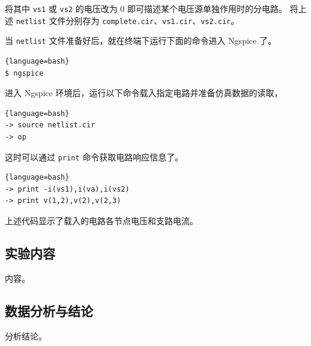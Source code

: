 \documentclass[UTF8,linespread=1.236]{ctexart}
\begin{document}
将其中 \verb|vs1| 或 \verb|vs2| 的电压改为 $0$ 即可描述某个电压源单独作用时的分电路。
将上述 \verb|netlist| 文件分别存为 \verb|complete.cir|、\verb|vs1.cir|、\verb|vs2.cir|。

当 \verb|netlist| 文件准备好后，就在终端下运行下面的命令进入 Ngspice 了。
\begin{lstlisting}{language=bash}
$ ngspice
\end{lstlisting}

进入 Ngspice 环境后，运行以下命令载入指定电路并准备仿真数据的读取，
\begin{lstlisting}{language=bash}
-> source netlist.cir
-> op
\end{lstlisting}

这时可以通过 \verb|print| 命令获取电路响应信息了。
\begin{lstlisting}{language=bash}
-> print -i(vs1),i(va),i(vs2)
-> print v(1,2),v(2),v(2,3)
\end{lstlisting}
上述代码显示了载入的电路各节点电压和支路电流。

\subsection{实验内容}

内容。

\subsection{数据分析与结论}

分析结论。
\end{document}
